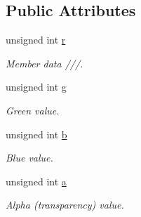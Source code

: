 \subsection*{Public Attributes}
\begin{DoxyCompactItemize}
\item 
unsigned int \hyperlink{classjetfuel_1_1draw_1_1Color_a282cc70a95a42570a350d2de16376346}{r}
\begin{DoxyCompactList}\small\item\em Member data ///. \end{DoxyCompactList}\item 
\mbox{\label{classjetfuel_1_1draw_1_1Color_a5229cd76a67a7236ad54ee2335c1c98a}} 
unsigned int \hyperlink{classjetfuel_1_1draw_1_1Color_a5229cd76a67a7236ad54ee2335c1c98a}{g}
\begin{DoxyCompactList}\small\item\em Green value. \end{DoxyCompactList}\item 
\mbox{\label{classjetfuel_1_1draw_1_1Color_af4152e984d80c8486184be7572783ebf}} 
unsigned int \hyperlink{classjetfuel_1_1draw_1_1Color_af4152e984d80c8486184be7572783ebf}{b}
\begin{DoxyCompactList}\small\item\em Blue value. \end{DoxyCompactList}\item 
\mbox{\label{classjetfuel_1_1draw_1_1Color_a5155fa4fb77a1e8058c79345de5300c4}} 
unsigned int \hyperlink{classjetfuel_1_1draw_1_1Color_a5155fa4fb77a1e8058c79345de5300c4}{a}
\begin{DoxyCompactList}\small\item\em Alpha (transparency) value. \end{DoxyCompactList}\end{DoxyCompactItemize}
